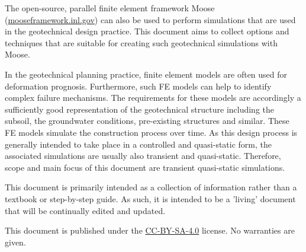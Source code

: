 The open-source, parallel finite element framework Moose
(\href{https://mooseframework.inl.gov}{mooseframework.inl.gov}) can also be
used to perform simulations that are used in the geotechnical design practice.
This document aims to collect options and techniques that are suitable for
creating such geotechnical simulations with Moose.

In the geotechnical planning practice, finite element models are often used for
deformation prognosis. Furthermore, such FE models can help to identify complex
failure mechanisms. The requirements for these models are accordingly a
sufficiently good representation of the geotechnical structure including the
subsoil, the groundwater conditions, pre-existing structures and similar. These
FE models simulate the construction process over time. As this design process
is generally intended to take place in a controlled and quasi-static form, the
associated simulations are usually also transient and quasi-static. Therefore,
scope and main focus of this document are transient quasi-static simulations.

This document is primarily intended as a collection of information rather than
a textbook or step-by-step guide. As such, it is intended to be a 'living'
document that will be continually edited and updated.

This document is published under the
\href{https://creativecommons.org/licenses/by-sa/4.0/}{CC-BY-SA-4.0} license.
No warranties are given.